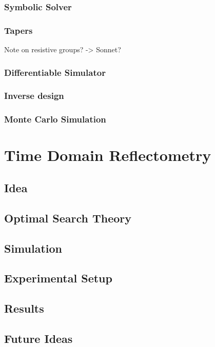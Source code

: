\documentclass{article}
\begin{document}
\subsubsection{Symbolic Solver}

\subsubsection{Tapers}

Note on resistive groups? -> Sonnet?

\subsubsection{Differentiable Simulator}

\subsubsection{Inverse design}

\subsubsection{Monte Carlo Simulation}

\section{Time Domain Reflectometry}

\subsection{Idea}

\subsection{Optimal Search Theory}

\subsection{Simulation}

\subsection{Experimental Setup}

\subsection{Results}

\subsection{Future Ideas}
\end{document}
